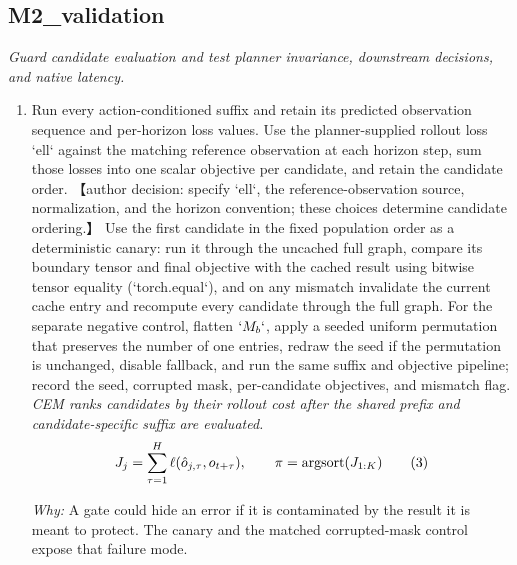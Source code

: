 \documentclass[10pt,a4paper]{article}
\begin{document}
\subsection*{M2\_validation}
\emph{Guard candidate evaluation and test planner invariance, downstream decisions, and native latency.}
\begin{enumerate}[leftmargin=*,start=3]
  \item Run every action-conditioned suffix and retain its predicted observation sequence and per-horizon loss values. Use the planner-supplied rollout loss `ell` against the matching reference observation at each horizon step, sum those losses into one scalar objective per candidate, and retain the candidate order. 【author decision: specify `ell`, the reference-observation source, normalization, and the horizon convention;\allowbreak{} these choices determine candidate ordering.】 Use the first candidate in the fixed population order as a deterministic canary: run it through the uncached full graph, compare its boundary tensor and final objective with the cached result using bitwise tensor equality (`torch.equal`), and on any mismatch invalidate the current cache entry and recompute every candidate through the full graph. For the separate negative control, flatten \(`M_{b}`\), apply a seeded uniform permutation that preserves the number of one entries, redraw the seed if the permutation is unchanged, disable fallback, and run the same suffix and objective pipeline;\allowbreak{} record the seed, corrupted mask, per-candidate objectives, and mismatch flag.
\noindent\emph{CEM ranks candidates by their rollout cost after the shared prefix and candidate-specific suffix are evaluated.}
\begin{equation}
\resizebox{\ifdim\width>\linewidth \linewidth\else\width\fi}{!}{$\displaystyle J_j = \sum_{\tau=1}^{H} \ell(\hat{o}_{j,\tau}, o_{t+\tau}), \qquad \pi = \operatorname{argsort}(J_{1:K})$} \tag{3}
\end{equation}
\par\emph{Why:} A gate could hide an error if it is contaminated by the result it is meant to protect. The canary and the matched corrupted-mask control expose that failure mode.

\end{enumerate}
\end{document}
